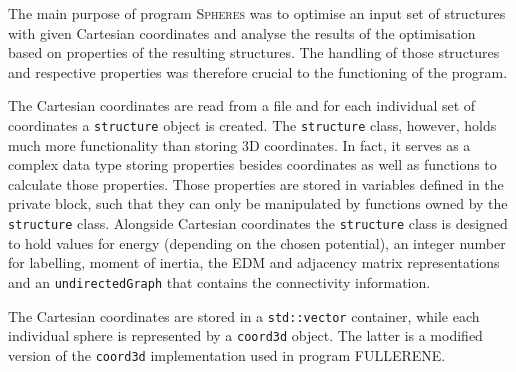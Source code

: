 The main purpose of program \textsc{Spheres} was to optimise an input set of
structures with given Cartesian coordinates and analyse the results of the
optimisation based on properties of the resulting structures. The handling of
those structures and respective properties was therefore crucial to the
functioning of the program.

The Cartesian coordinates are read from a file and for each individual set of
coordinates a \verb|structure| object is created. The \verb|structure| class,
however, holds much more functionality than storing 3D coordinates. In fact, it
serves as a complex data type storing properties besides coordinates as well as
functions to calculate those properties. Those properties are stored in
variables defined in the private block, such that they can only be manipulated
by functions owned by the \verb|structure| class. Alongside Cartesian
coordinates the \verb|structure| class is designed to hold values for energy
(depending on the chosen potential), an integer number for labelling, moment of
inertia, the \ac{EDM} and adjacency matrix representations and an
\verb|undirectedGraph| that contains the connectivity information.

The Cartesian coordinates are stored in a \verb|std::vector| container, while
each individual sphere is represented by a \verb|coord3d| object. The latter is
a modified version of the \verb|coord3d| implementation used in program
FULLERENE.\autocite{Schwerdtfeger_Programfullerenesoftware_2013} 

